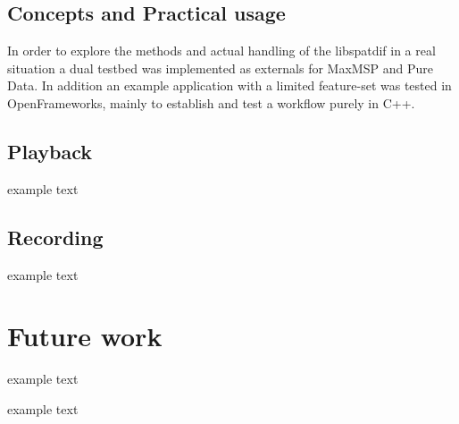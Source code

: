 \documentclass{article}
\begin{document}
\subsection{Concepts and Practical usage}\label{subsec:concepts}
In order to explore the methods and actual handling of the libspatdif in a real situation a dual testbed was implemented as externals for MaxMSP and Pure Data. In addition an example application with a limited feature-set was tested in OpenFrameworks, mainly to establish and test a workflow purely in C++.





\subsection{Playback}\label{sec:Playback}
example text

\subsection{Recording}\label{sub:body}
example text

\section{Future work}
example text


\begin{acknowledgments}
example text
\end{acknowledgments} 

% 
\printbibliography
\end{document}
